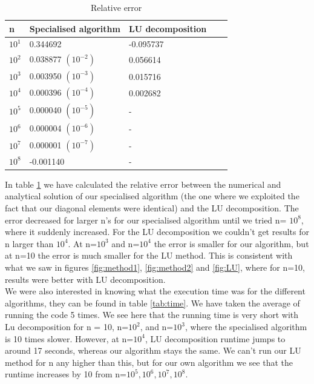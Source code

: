 \documentclass[oneside, final, 11pt, english, twocolumn]{article}
\begin{document}
\begin{table}[H]
    \caption{Relative error}
    \label{tab:error}
    \begin{tabular}{|l |l |l| ll}%
    \hline
      \textbf{n} & {Specialised algorithm} & {LU decomposition} \\ 
      \hline
      $10^1$ & 0.344692 &  -0.095737\\
       $10^2$ & 0.038877 $(10^{-2})$&  0.056614\\
      $10^3$ & 0.003950 $(10^{-3})$&  0.015716\\
      $10^4$ & 0.000396 $(10^{-4})$& 0.002682\\
      $10^5$ & 0.000040 $(10^{-5})$&  - \\ 
      $10^6$ &  0.000004 $(10^{-6})$& - \\ 
      $10^7$ & 0.000001 $(10^{-7})$& - \\ 
      $10^8$ & -0.001140 & - \\
      \hline
    \end{tabular}
\end{table} 

In table \ref{tab:error} we have calculated the relative error between the numerical and analytical solution of our specialised algorithm (the one where we exploited the fact that our diagonal elements were identical) and the LU decomposition. The error decreased for larger n's for our specialised algorithm until we tried n= $10^8$, where it suddenly increased.  For the LU decomposition we couldn't get results for n larger than $10^4$. At n=$10^3$ and n=$10^4$ the error is smaller for our algorithm, but at n=10 the error is much smaller for the LU method. This is consistent with what we saw in figures \ref{fig:method1}, \ref{fig:method2} and \ref{fig:LU}, where for n=10, results were better with LU decomposition. \\

We were also interested in knowing what the execution time was for the different algorithms, they can be found in table \ref{tab:time}. We have taken the average of running the code 5 times. We see here that the running time is very short with Lu decomposition for n = 10, n=$10^2$,  and n=$10^3$,  where the specialised algorithm is 10 times slower. However, at n=$10^4$, LU decomposition runtime jumps to around 17 seconds, whereas our algorithm stays the same. We can't run our LU method for n any higher than this, but for our own algorithm we see that the runtime increases by 10 from n=$10^5, 10^6,10^7,10^8$. 
\end{document}

